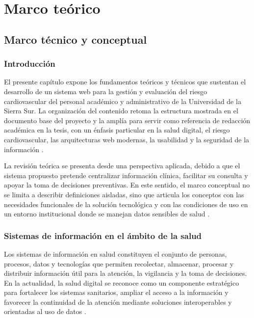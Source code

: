 \chapter{Marco teórico}

\section{Marco técnico y conceptual}

\subsection{Introducción}

El presente capítulo expone los fundamentos teóricos y técnicos que sustentan el desarrollo de un sistema web para la gestión y evaluación del riesgo cardiovascular del personal académico y administrativo de la Universidad de la Sierra Sur. La organización del contenido retoma la estructura mostrada en el documento base del proyecto y la amplía para servir como referencia de redacción académica en la tesis, con un énfasis particular en la salud digital, el riesgo cardiovascular, las arquitecturas web modernas, la usabilidad y la seguridad de la información \textcite{who2025cvd,who2025digitalhealth}.

La revisión teórica se presenta desde una perspectiva aplicada, debido a que el sistema propuesto pretende centralizar información clínica, facilitar su consulta y apoyar la toma de decisiones preventivas. En este sentido, el marco conceptual no se limita a describir definiciones aisladas, sino que articula los conceptos con las necesidades funcionales de la solución tecnológica y con las condiciones de uso en un entorno institucional donde se manejan datos sensibles de salud \textcite{who2025digitalhealth}.

\subsection{Sistemas de información en el ámbito de la salud}

Los sistemas de información en salud constituyen el conjunto de personas, procesos, datos y tecnologías que permiten recolectar, almacenar, procesar y distribuir información útil para la atención, la vigilancia y la toma de decisiones. En la actualidad, la salud digital se reconoce como un componente estratégico para fortalecer los sistemas sanitarios, ampliar el acceso a la información y favorecer la continuidad de la atención mediante soluciones interoperables y orientadas al uso de datos \textcite{who2025digitalhealth}.

